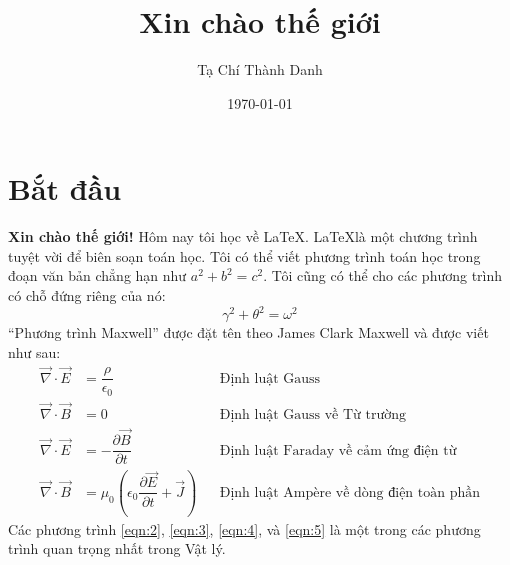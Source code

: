 \documentclass[a4paper,12pt,notitlepage]{article}
\title{Xin chào thế giới}
\author{Tạ Chí Thành Danh}
\date{\today}
\begin{document}
	\maketitle
	\section{Bắt đầu}
	\textbf{Xin chào thế giới!} Hôm nay tôi học về \LaTeX. \LaTeX là một chương trình tuyệt vời để biên soạn toán học. Tôi có thể viết phương trình toán học trong đoạn văn bản chẳng hạn như $a^2 + b^2 = c^2$. Tôi cũng có thể cho các phương trình có chỗ đứng riêng của nó:
	\begin{equation}
		\gamma^2 + \theta^2 = \omega^2
	\end{equation}
	``Phương trình Maxwell'' được đặt tên theo James Clark Maxwell và được viết như sau:
	\begin{align} 
		\vec\nabla \cdot \vec E &= \dfrac{\rho}{\epsilon_0} && \text{Định luật Gauss} \label{eqn:2} \\
		\vec\nabla \cdot \vec B &= 0 && \text{Định luật Gauss về Từ trường} \label{eqn:3} \\
		\vec\nabla \cdot \vec E &= -\dfrac{\partial \vec B}{\partial t} && \text{Định luật Faraday về cảm ứng điện từ} \label{eqn:4} \\
		\vec\nabla \cdot \vec B &= \mu_0 \left(\epsilon_0 \dfrac{\partial \vec E}{\partial t} + \vec J\right) && \text{Định luật Ampère về dòng điện toàn phần} \label{eqn:5}
	\end{align}
	Các phương trình \ref{eqn:2}, \ref{eqn:3}, \ref{eqn:4}, và \ref{eqn:5} là một trong các phương trình quan trọng nhất trong Vật lý.
\end{document}
